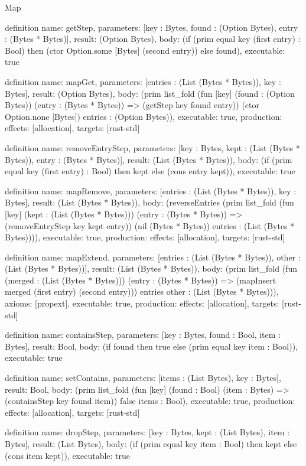 \begin{lexlean}{Map}
\begin{semanticmodule}
definition{
  name: getStep,
  parameters: [key : Bytes, found : (Option Bytes), entry : (Bytes * Bytes)],
  result: (Option Bytes),
  body: (if (prim equal key (first entry) : Bool) then (ctor Option.some [Bytes] (second entry)) else found),
  executable: true
}

definition{
  name: mapGet,
  parameters: [entries : (List (Bytes * Bytes)), key : Bytes],
  result: (Option Bytes),
  body: (prim list_fold (fun [key] (found : (Option Bytes)) (entry : (Bytes * Bytes)) => (getStep key found entry)) (ctor Option.none [Bytes]) entries : (Option Bytes)),
  executable: true,
  production: {effects: [allocation], targets: [rust-std]}
}

definition{
  name: removeEntryStep,
  parameters: [key : Bytes, kept : (List (Bytes * Bytes)), entry : (Bytes * Bytes)],
  result: (List (Bytes * Bytes)),
  body: (if (prim equal key (first entry) : Bool) then kept else (cons entry kept)),
  executable: true
}

definition{
  name: mapRemove,
  parameters: [entries : (List (Bytes * Bytes)), key : Bytes],
  result: (List (Bytes * Bytes)),
  body: (reverseEntries (prim list_fold (fun [key] (kept : (List (Bytes * Bytes))) (entry : (Bytes * Bytes)) => (removeEntryStep key kept entry)) (nil (Bytes * Bytes)) entries : (List (Bytes * Bytes)))),
  executable: true,
  production: {effects: [allocation], targets: [rust-std]}
}

definition{
  name: mapExtend,
  parameters: [entries : (List (Bytes * Bytes)), other : (List (Bytes * Bytes))],
  result: (List (Bytes * Bytes)),
  body: (prim list_fold (fun (merged : (List (Bytes * Bytes))) (entry : (Bytes * Bytes)) => (mapInsert merged (first entry) (second entry))) entries other : (List (Bytes * Bytes))),
  axioms: [propext],
  executable: true,
  production: {effects: [allocation], targets: [rust-std]}
}

definition{
  name: containsStep,
  parameters: [key : Bytes, found : Bool, item : Bytes],
  result: Bool,
  body: (if found then true else (prim equal key item : Bool)),
  executable: true
}

definition{
  name: setContains,
  parameters: [items : (List Bytes), key : Bytes],
  result: Bool,
  body: (prim list_fold (fun [key] (found : Bool) (item : Bytes) => (containsStep key found item)) false items : Bool),
  executable: true,
  production: {effects: [allocation], targets: [rust-std]}
}

definition{
  name: dropStep,
  parameters: [key : Bytes, kept : (List Bytes), item : Bytes],
  result: (List Bytes),
  body: (if (prim equal key item : Bool) then kept else (cons item kept)),
  executable: true
}


\end{semanticmodule}
\end{lexlean}
